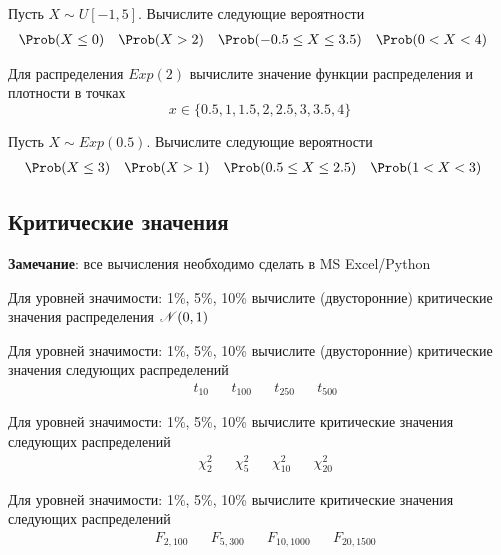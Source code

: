 \begin{exercise}
Пусть \(X\sim U[-1, 5]\). Вычислите следующие вероятности
\begin{align*}
	&\Prob(X\leq0) & &\Prob(X>2) & 
	&\Prob(-0.5\leq X\leq3.5) & &\Prob(0<X<4)
\end{align*}
\end{exercise}

\begin{exercise}
Для распределения \(Exp(2)\) 
вычислите значение функции распределения и плотности в точках
\[
	x\in\{0.5, 1, 1.5, 2, 2.5, 3, 3.5, 4\}
\]
\end{exercise}

\begin{exercise}
Пусть \(X\sim Exp(0.5)\). Вычислите следующие вероятности
\begin{align*}
	&\Prob(X\leq3) & &\Prob(X>1) & 
	&\Prob(0.5\leq X\leq2.5) & &\Prob(1<X<3)
\end{align*}
\end{exercise}

\subsection{Критические значения}

\textbf{Замечание}: все вычисления необходимо сделать в MS Excel/Python

\begin{exercise}
Для уровней значимости: 1\%, 5\%, 10\% вычислите (двусторонние) 
критические значения распределения \({\mathscr N}(0,1)\)
\end{exercise}

\begin{exercise}
Для уровней значимости: 1\%, 5\%, 10\% вычислите (двусторонние) 
критические значения следующих распределений
\begin{align*}
	&t_{10} & &t_{100} & &t_{250} & &t_{500}
\end{align*}
\end{exercise}

\begin{exercise}
Для уровней значимости: 1\%, 5\%, 10\% вычислите
критические значения следующих распределений
\begin{align*}
	&\chi^2_{2} & &\chi^2_{5} & &\chi^2_{10} & &\chi^2_{20}
\end{align*}
\end{exercise}

\begin{exercise}
Для уровней значимости: 1\%, 5\%, 10\% вычислите
критические значения следующих распределений
\begin{align*}
	&F_{2,100} & &F_{5, 300} & &F_{10, 1000} & &F_{20, 1500}
\end{align*}
\end{exercise}
